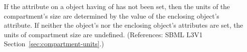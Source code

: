 If the  attribute on a \Compartment object having
 of  has not been set, then the units of
the compartment's size are determined by the value of the enclosing \Model
object's  attribute.  If neither the \Compartment
object's  nor the enclosing \Model object's
 attributes are set, the units of compartment size are
undefined.  (References: SBML L3V1 Section~\ref{sec:compartment-units}.)
